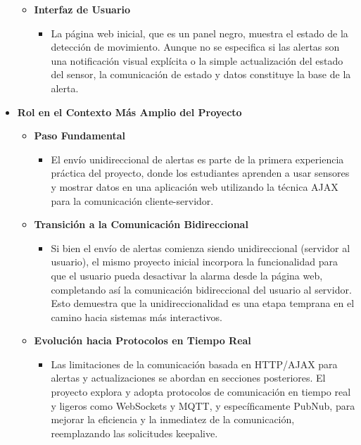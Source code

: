 \documentclass{report}
\begin{document}
\begin{itemize}
\begin{itemize}
        \item \textbf{Interfaz de Usuario}
        \begin{itemize}
            \item La página web inicial, que es un panel negro, muestra el estado de la detección de movimiento. Aunque no se especifica si las alertas 
            son una notificación visual explícita o la simple actualización del estado del sensor, la comunicación de estado y datos constituye la base 
            de la alerta.
        \end{itemize}
    \end{itemize}

    \item \textbf{Rol en el Contexto Más Amplio del Proyecto}
    \begin{itemize}
        \item \textbf{Paso Fundamental}
        \begin{itemize}
            \item El envío unidireccional de alertas es parte de la primera experiencia práctica del proyecto, donde los estudiantes aprenden a usar sensores y 
            mostrar datos en una aplicación web utilizando la técnica AJAX para la comunicación cliente-servidor.
        \end{itemize}
        \item \textbf{Transición a la Comunicación Bidireccional}
        \begin{itemize}
            \item Si bien el envío de alertas comienza siendo unidireccional (servidor al usuario), el mismo proyecto inicial incorpora la funcionalidad para que 
            el usuario pueda desactivar la alarma desde la página web, completando así la comunicación bidireccional del usuario al servidor. 
            Esto demuestra que la unidireccionalidad es una etapa temprana en el camino hacia sistemas más interactivos.
        \end{itemize}
        \item \textbf{Evolución hacia Protocolos en Tiempo Real}
        \begin{itemize}
            \item Las limitaciones de la comunicación basada en HTTP/AJAX para alertas y actualizaciones se abordan en secciones posteriores. El proyecto explora y 
            adopta protocolos de comunicación en tiempo real y ligeros como WebSockets y MQTT, y específicamente PubNub, para mejorar la eficiencia y la 
            inmediatez de la comunicación, reemplazando las solicitudes keepalive.

\end{itemize}
\end{itemize}
\end{itemize}
\end{document}
